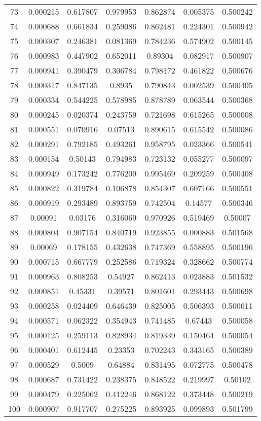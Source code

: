 \begin{table}
\begin{tabular}{c|c|c|c|c|c|c}
73 & 0.000215 & 0.617807 & 0.979953 & 0.862874 & 0.005375 & 0.500242\\
74 & 0.000688 & 0.661834 & 0.259086 & 0.862481 & 0.224301 & 0.500942\\
75 & 0.000307 & 0.246381 & 0.081369 & 0.784236 & 0.574902 & 0.500145\\
76 & 0.000983 & 0.447902 & 0.652011 & 0.89304 & 0.082917 & 0.500907\\
77 & 0.000941 & 0.390479 & 0.306784 & 0.798172 & 0.461822 & 0.500676\\
78 & 0.000317 & 0.847135 & 0.8935 & 0.790843 & 0.002539 & 0.500405\\
79 & 0.000334 & 0.544225 & 0.578985 & 0.878789 & 0.063544 & 0.500368\\
80 & 0.000245 & 0.020374 & 0.243759 & 0.721698 & 0.615265 & 0.500008\\
81 & 0.000551 & 0.070916 & 0.07513 & 0.890615 & 0.615542 & 0.500086\\
82 & 0.000291 & 0.792185 & 0.493261 & 0.958795 & 0.023366 & 0.500541\\
83 & 0.000154 & 0.50143 & 0.794983 & 0.723132 & 0.055277 & 0.500097\\
84 & 0.000949 & 0.173242 & 0.776209 & 0.995469 & 0.209259 & 0.500408\\
85 & 0.000822 & 0.319784 & 0.106878 & 0.854307 & 0.607166 & 0.500551\\
86 & 0.000919 & 0.293489 & 0.893759 & 0.742504 & 0.14577 & 0.500346\\
87 & 0.00091 & 0.03176 & 0.316069 & 0.970926 & 0.519469 & 0.50007\\
88 & 0.000804 & 0.907154 & 0.840719 & 0.923855 & 0.000883 & 0.501568\\
89 & 0.00069 & 0.178155 & 0.432638 & 0.747369 & 0.558895 & 0.500196\\
90 & 0.000715 & 0.667779 & 0.252586 & 0.719324 & 0.328662 & 0.500774\\
91 & 0.000963 & 0.808253 & 0.54927 & 0.862413 & 0.023883 & 0.501532\\
92 & 0.000851 & 0.45331 & 0.39571 & 0.801601 & 0.293443 & 0.500698\\
93 & 0.000258 & 0.024409 & 0.646439 & 0.825005 & 0.506393 & 0.500011\\
94 & 0.000571 & 0.062322 & 0.354943 & 0.741485 & 0.67443 & 0.500058\\
95 & 0.000125 & 0.259113 & 0.828934 & 0.819339 & 0.150464 & 0.500054\\
96 & 0.000401 & 0.612445 & 0.23353 & 0.702243 & 0.343165 & 0.500389\\
97 & 0.000529 & 0.5009 & 0.64884 & 0.831495 & 0.072775 & 0.500478\\
98 & 0.000687 & 0.731422 & 0.238375 & 0.848522 & 0.219997 & 0.50102\\
99 & 0.000479 & 0.225062 & 0.412246 & 0.868122 & 0.373448 & 0.500219\\
100 & 0.000907 & 0.917707 & 0.275225 & 0.893925 & 0.099893 & 0.501799\\
\end{tabular}
\end{table}
